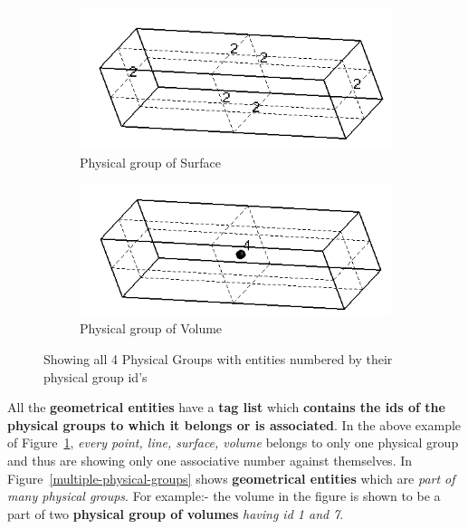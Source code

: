 \documentclass[11pt]{article}
\begin{document}
\begin{figure}[h]
   \begin{subfigure}[b]{0.35\textwidth}
    \includegraphics[width=\textwidth]{Images/PhysicalSurface.png} 
    \caption{Physical group of Surface}
  \end{subfigure}
  \begin{subfigure}[b]{0.35\textwidth}
    \includegraphics[width=\textwidth]{Images/PhysicalVolume.png}
  \caption{Physical group of Volume}
  \end{subfigure}

  \caption{\label{4-physical-groups} Showing all 4 Physical Groups with entities 
  numbered by their physical group id's}

\end{figure}

All   the   \textbf{geometrical  entities}  have  a  \textbf{tag  list}  which
\textbf{contains  the  ids of the \textbf{physical groups} to which it belongs
or  is  associated}.  In  the above example of Figure~\ref{4-physical-groups},
\textit{every  point,  line,  surface,  volume  } belongs to only one physical
group  and thus are showing only one associative number against themselves. In
Figure~\ref{multiple-physical-groups}   shows   \textbf{geometrical  entities}
which  are  \textit{part of many physical groups}. For example:- the volume in
the  figure  is  shown  to be a part of two \textbf{physical group of volumes}
\textit{having id 1 and 7}. 
\end{document}
